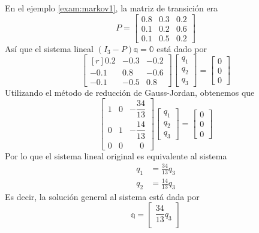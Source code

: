 \newpage

\begin{example}
    En el ejemplo \ref{exam:markov1}, la matriz de transición era
    $$P = \begin{bmatrix}
        0.8 & 0.3 & 0.2 \\
        0.1 & 0.2 & 0.6 \\
        0.1 & 0.5 & 0.2
    \end{bmatrix}$$
    Así que el sistema lineal $(I_3 - P)\mathbb{q} = \mathbb{0}$ está dado por
    $$\begin{bmatrix*}[r]
        0.2 & -0.3 & -0.2 \\
        -0.1 & 0.8 & -0.6 \\
        -0.1 & -0.5 & 0.8
    \end{bmatrix*}\begin{bmatrix}
        q_1 \\
        q_2 \\
        q_3
    \end{bmatrix} = \begin{bmatrix}
        0 \\
        0 \\
        0
    \end{bmatrix}$$
    Utilizando el método de reducción de Gauss-Jordan, obtenemos que
    $$\begin{bmatrix}
        1 & 0 & -\dfrac{34}{13} \\[3mm]
        0 & 1 & -\dfrac{14}{13} \\[3mm]
        0 & 0 & \phantom{-}0
    \end{bmatrix}\begin{bmatrix}
        q_1 \\
        q_2 \\
        q_3
    \end{bmatrix} = \begin{bmatrix}
        0 \\
        0 \\
        0
    \end{bmatrix}$$
    Por lo que el sistema lineal original es equivalente al sistema
    \begin{align*}
        q_1 & = \frac{34}{13} q_3 \\
        q_2 & = \frac{14}{13} q_3
    \end{align*}
    Es decir, la solución general al sistema está dada por
    $$\mathbb{q} = \begin{bmatrix}
        \dfrac{34}{13} q_3 \\[3mm]

\end{bmatrix}$$
\end{example}
